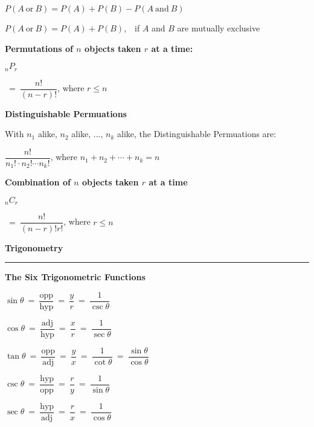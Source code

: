 \documentclass{article}
\begin{document}
\begin{large}
\hspace{2.0in} $P(A\ \text{or}\ B) = P(A) + P(B) - P(A\ \text{and}\ B)$

\hspace{1.5in} $P(A\ \text{or}\ B) = P(A) + P(B)$,\ \ if $A$ and $B$ are mutually exclusive

\textbf{Permutations of $n$ objects taken $r$ at a time:}

\hspace{2.5in} \begin{Large}$\phantom{ }_{n}P_{r}$\end{Large}$\ =\ \dfrac{n!}{(n-r)!}$, where $r \leq n$

\textbf{Distinguishable Permuations}

\hspace{1.0in} With $n_{1}$ alike, $n_{2}$ alike, ..., $n_{k}$ alike, the Distinguishable Permuations are:

\hspace{2.0in} $\dfrac{n!}{n_{1}!\cdot n_{2}!\cdots n_{k}!}$, where $n_{1} + n_{2} + \cdots + n_{k} = n$

\textbf{Combination of $n$ objects taken $r$ at a time}

\hspace{2.5in} \begin{Large}$\phantom{ }_{n}C_{r}$\end{Large}$\ =\ \dfrac{n!}{(n-r)!r!}$, where $r \leq n$

\newpage

\begin{center}{\Huge \textbf{Trigonometry} \hrule}\end{center}

\setlength{\columnsep}{3cm}
\begin{multicols}{2}

\textbf{The Six Trigonometric Functions}

$\sin \theta\ =\ \dfrac{\text{opp}}{\text{hyp}}\ =\ \dfrac{y}{r}\ =\ \dfrac{1}{\csc \theta}$

$\cos \theta\ =\ \dfrac{\text{adj}}{\text{hyp}}\ =\ \dfrac{x}{r}\ =\ \dfrac{1}{\sec \theta}$

$\tan \theta\ =\ \dfrac{\text{opp}}{\text{adj}}\ =\ \dfrac{y}{x}\ =\ \dfrac{1}{\cot \theta}\ =\ \dfrac{\sin \theta}{\cos \theta}$

$\csc \theta\ =\ \dfrac{\text{hyp}}{\text{opp}}\ =\ \dfrac{r}{y}\ =\ \dfrac{1}{\sin \theta}$

$\sec \theta\ =\ \dfrac{\text{hyp}}{\text{adj}}\ =\ \dfrac{r}{x}\ =\ \dfrac{1}{\cos \theta}$


\end{multicols}
\end{large}
\end{document}
